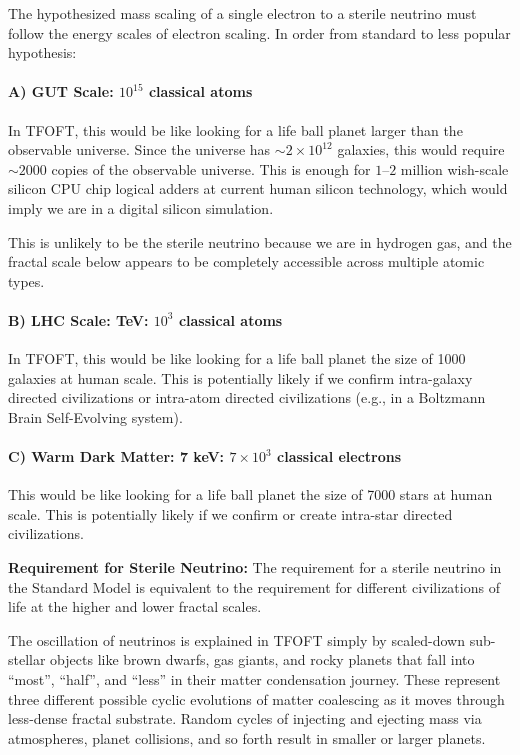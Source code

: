 \documentclass[11pt,a4paper]{article}
\begin{document}
      The hypothesized mass scaling of a single electron to a sterile neutrino must follow the energy scales of electron scaling. In order from standard to less popular hypothesis:

      \paragraph{A) GUT Scale: $10^{15}$ classical atoms}

      In TFOFT, this would be like looking for a life ball planet larger than the observable universe. Since the universe has $\sim 2 \times 10^{12}$ galaxies, this would require $\sim 2000$ copies of the observable universe. This is enough for $1$--$2$ million wish-scale silicon CPU chip logical adders at current human silicon technology, which would imply we are in a digital silicon simulation.

      This is unlikely to be the sterile neutrino because we are in hydrogen gas, and the fractal scale below appears to be completely accessible across multiple atomic types.

      \paragraph{B) LHC Scale: TeV: $10^3$ classical atoms}

      In TFOFT, this would be like looking for a life ball planet the size of 1000 galaxies at human scale. This is potentially likely if we confirm intra-galaxy directed civilizations or intra-atom directed civilizations (e.g., in a Boltzmann Brain Self-Evolving system).

      \paragraph{C) Warm Dark Matter: 7 keV: $7 \times 10^3$ classical electrons}

      This would be like looking for a life ball planet the size of 7000 stars at human scale. This is potentially likely if we confirm or create intra-star directed civilizations.

      \noindent\textbf{Requirement for Sterile Neutrino:} The requirement for a sterile neutrino in the Standard Model is equivalent to the requirement for different civilizations of life at the higher and lower fractal scales.

      The oscillation of neutrinos is explained in TFOFT simply by scaled-down sub-stellar objects like brown dwarfs, gas giants, and rocky planets that fall into ``most'', ``half'', and ``less'' in their matter condensation journey. These represent three different possible cyclic evolutions of matter coalescing as it moves through less-dense fractal substrate. Random cycles of injecting and ejecting mass via atmospheres, planet collisions, and so forth result in smaller or larger planets.
\end{document}
